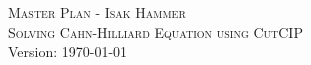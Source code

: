 \documentclass[landscape,a4paper]{article}
\begin{document}
\pagestyle{empty} %

\noindent



\begin{center}
\textsc{\LARGE Master Plan - Isak Hammer  }\\
\textsc{\large Solving Cahn-Hilliard Equation using CutCIP}\\
Version: \today

\end{center}
\end{document}
